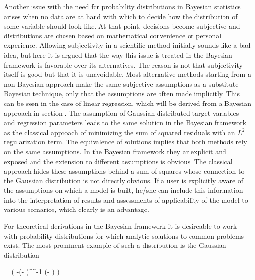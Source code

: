     Another issue with the need for probability distributions in Bayesian
    statistics arises when no data are at hand with which to decide how the
    distribution of some variable should look like. At that point, decisions
    become subjective and distributions are chosen based on mathematical
    convenience or personal experience. Allowing subjectivity in a scientific
    method initially sounds like a bad idea, but here it is argued that the way
    this issue is treated in the Bayesian framework is favorable over its
    alternatives. The reason is not that subjectivity itself is good but that
    it is unavoidable. Most alternative methods starting from a non-Bayesian
    approach make the same subjective assumptions as a substitute Bayesian
    technique, only that the assumptions are often made implicitly.
    This can be seen in the case of linear regression, which will be derived
    from a Bayesian approach in section . The
    assumption of Gaussian-distributed target variables and regression
    parameters leads to the same solution in the Bayesian framework as the
    classical approach of minimizing the sum of squared residuals with an $L^2$
    regularization term. The equivalence of solutions implies that both methods
    rely on the same assumptions. In the Bayesian framework they ar explicit
    and exposed and the extension to different assumptions is obvious. The
    classical approach hides these assumptions behind a sum of squares whose
    connection to the Gaussian distribution is not directly obvious. If a user
    is explicitly aware of the assumptions on which a model is built, he/she
    can include this information into the interpretation of results and
    assessments of applicability of the model to various scenarios, which
    clearly is an advantage.

\stopsection

\startsection[title=The Multivariate Gaussian Distribution]

    For theoretical derivations in the Bayesian framework it is desireable to
    work with probability distributions for which analytic solutions to common
    problems exist. The most prominent example of such a distribution is the
    Gaussian distribution

    \placeformula[eq:gaussian]
    \startformula
        \GAUSS{\VECX}{\MEANVEC}{\COVMAT}
        = 
            \exp \left( -(\VECX - \MEANVEC)^\top \COVMAT^{-1}
            (\VECX - \MEANVEC) \right)
    \stopformula

